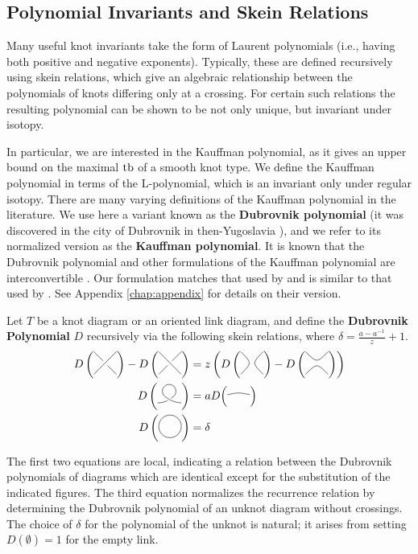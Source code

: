 \subsection{Polynomial Invariants and Skein Relations}

Many useful knot invariants take the form of Laurent polynomials (i.e., having both positive and negative exponents). Typically, these are defined recursively using skein relations, which give an algebraic relationship between the polynomials of knots differing only at a crossing. For certain such relations the resulting polynomial can be shown to be not only unique, but invariant under isotopy.

In particular, we are interested in the Kauffman polynomial, as it gives an upper bound on the maximal $\operatorname{tb}$ of a smooth knot type. We define the Kauffman polynomial in terms of the L-polynomial, which is an invariant only under regular isotopy.
There are many varying definitions of the Kauffman polynomial in the literature. We use here a variant known as the \textbf{Dubrovnik polynomial} (it was discovered in the city of Dubrovnik in then-Yugoslavia \cite{kauffman}), and we refer to its normalized version as the \textbf{Kauffman polynomial}. 
It is known that the Dubrovnik polynomial and other formulations of the Kauffman polynomial are interconvertible \cite{kauffman}.
Our formulation matches that used by \cite{ferrand} and is similar to that used by \cite{lu-zhong}. See Appendix \ref{chap:appendix} for details on their version.

Let $T$ be a knot diagram or an oriented link diagram, and define the \textbf{Dubrovnik Polynomial} $D$ recursively via the following skein relations, where ${\delta = \frac{a - a^{-1}}{z} + 1}$.
\begin{align}
    D\left(\Lmin\right) - D\left(\Lplus\right) &= z \left( D\left(\Lzero\right) - D\left(\Linf\right) \right) \\
    D\left(\Lr\right) &= a D \Big(\Ln\Big)\\
    D\left(\Lu\right) &= \delta
\end{align}

The first two equations are local, indicating a relation between the Dubrovnik polynomials of diagrams which are identical except for the substitution of the indicated figures. The third equation normalizes the recurrence relation by determining the Dubrovnik polynomial of an unknot diagram without crossings. The choice of $\delta$ for the polynomial of the unknot is natural; it arises from setting $D(\emptyset) = 1$ for the empty link.

